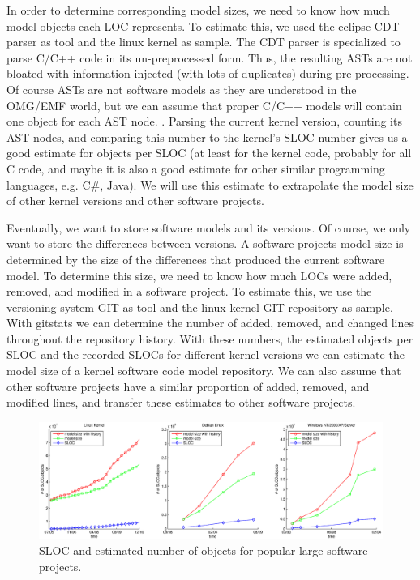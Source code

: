 In order to determine corresponding model sizes, we need to know how much model objects each LOC represents. To estimate this, we used the eclipse CDT parser as tool and the linux kernel as sample. The CDT parser is specialized to parse C/C++ code in its un-preprocessed form. Thus, the resulting ASTs are not bloated with information injected (with lots of duplicates) during pre-processing. Of course ASTs are not software models as they are understood in the OMG/EMF world, but we can assume that proper C/C++ models will contain one object for each AST node. . Parsing the current kernel version, counting its AST nodes, and comparing this number to the kernel's SLOC number gives us a good estimate for objects per SLOC (at least for the kernel code, probably for all C code, and maybe it is also a good estimate for other similar programming languages, e.g. C\#, Java). We will use this estimate to extrapolate the model size of other kernel versions and other software projects. 

Eventually, we want to store software models and its versions. Of course, we only want to store the differences between versions. A software projects model size is determined by the size of the differences that produced the current software model. To determine this size, we need to know how much LOCs were added, removed, and modified in a software project. To estimate this, we use the versioning system GIT as tool and the linux kernel GIT repository as sample. With gitstats we can determine the number of added, removed, and changed lines throughout the repository history. With these numbers, the estimated objects per SLOC and the recorded SLOCs for different kernel versions we can estimate the model size of a kernel software code model repository. We can also assume that other software projects have a similar proportion of added, removed, and modified lines, and transfer these estimates to other software projects. 

\begin{figure}
  \centering
  \includegraphics[width=\linewidth]{figures/software_model_sizes}
  \caption{SLOC and estimated number of objects for popular large software projects.}
  \label{fig:software_model_sizes}
\end{figure}

